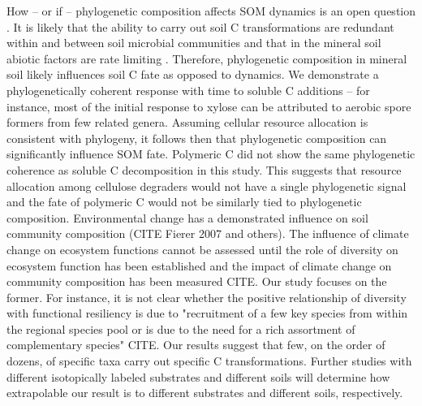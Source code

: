 How -- or if -- phylogenetic composition affects SOM dynamics is an open
question \citep{Schimel_2012}. It is likely that the ability to carry out soil
C transformations are redundant within and between soil microbial communities
and that in the mineral soil abiotic factors are rate limiting
\citep{Schimel_2012}. Therefore, phylogenetic composition in mineral soil
likely influences soil C fate as opposed to dynamics. We demonstrate
a phylogenetically coherent response with time to soluble C additions -- for
instance, most of the initial response to xylose can be attributed to aerobic
spore formers from few related genera. Assuming cellular resource allocation is
consistent with phylogeny, it follows then that phylogenetic composition can
significantly influence SOM fate. Polymeric C did not show the same
phylogenetic coherence as soluble C decomposition in this study. This suggests
that resource allocation among cellulose degraders would not have a single
phylogenetic signal and the fate of polymeric C would not be similarly tied to
phylogenetic composition.
Environmental change has a demonstrated influence on soil community composition
(CITE Fierer 2007 and others). The influence of climate change on ecosystem
functions cannot be assessed until the role of diversity on ecosystem function
has been established and the impact of climate change on community composition
has been measured CITE. Our study focuses on the former. For instance, it is
not clear whether the positive relationship of diversity with functional
resiliency is due to "recruitment of a few key species from within the regional
species pool or is due to the need for a rich assortment of complementary
species" CITE. Our results suggest that few, on the order of dozens, of
specific taxa carry out specific C transformations. Further studies with
different isotopically labeled substrates and different soils will determine
how extrapolable our result is to different substrates and different soils,
respectively. 

